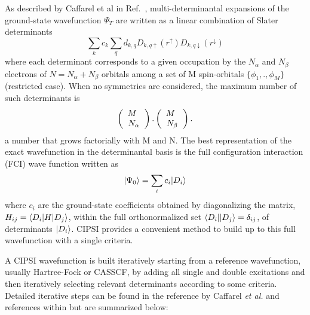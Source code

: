 As described by Caffarel et al in Ref.~\cite{Caffarel2013},
multi-determinantal expansions of the ground-state wavefunction
$\Psi_T$ are written as a linear combination of Slater determinants
\begin{equation}
\sum_k c_k \sum_q d_{k,q}D_{k,q\uparrow } (r^{\uparrow})D_{k,q\downarrow}(r^{\downarrow}) %
\end{equation}
  where each determinant corresponds to a given occupation by the $N_{\alpha}$ and $N_{\beta}$ electrons of $N=N_{\alpha}+N_{\beta}$ orbitals among a set of M spin-orbitals $\{\phi_1,.,\phi_M\}$ (restricted case). When no symmetries are
considered, the maximum number of such determinants is
\begin{eqnarray}
\label{eqn:Det-Permutations}
\left(
\begin{array}{c} M \hspace{1.5mm} \\ N_{\alpha}  \end{array}
\right).
\left(
\begin{array}{c} M \hspace{1.5mm} \\ N_{\beta}  \end{array}
\right).
\end{eqnarray}
a number that grows factorially with M and N. The best representation of the exact wavefunction in the determinantal basis is the full configuration interaction (FCI) wave function written as 
\begin{equation}
\ket{\Psi_0}=\sum_{i} c_{i} \ket{D_i}
\end{equation}
where $c_i$ are the ground-state coefficients obtained by
diagonalizing the matrix, $H_{ij}=\bra{D_i}H\ket{D_j}$, within the
full orthonormalized set $\bra{D_i}\ket{D_j}=\delta_{ij}$, of
determinants $\ket{D_i}$. CIPSI provides a convenient method to build up to this full wavefunction with a single criteria.


A CIPSI wavefunction is built iteratively starting from a reference
wavefunction, usually Hartree-Fock or CASSCF, by adding all single and
double excitations and then iteratively selecting relevant
determinants according to some criteria. Detailed iterative steps can
be found in the reference by Caffarel \textit{et al.} and references
within\cite{Caffarel2013, Scemama2016,Scemama2018,Garniron2017-2} but
are summarized below:

